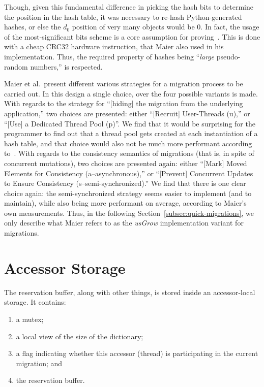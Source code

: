 Though, given this fundamental difference in picking the hash bits to determine the position in the hash table, it was necessary to re-hash Python-generated hashes, or else the $d_0$ position of very many objects would be $0$.
In fact, the usage of the most-significant bits scheme is a core assumption for proving~\cite[Lemma~5.1]{maier}.
This is done with a cheap CRC32 hardware instruction, that Maier also used in his implementation.
Thus, the required property of hashes being ``\emph{large} pseudo-random numbers,'' is respected.

Maier et al.\ present different various strategies for a migration process to be carried out.
In this design a single choice, over the four possible variants is made.
With regards to the strategy for ``[hiding] the migration from the underlying application,'' two choices are presented: either ``[Recruit] User-Threads (u),'' or ``[Use] a Dedicated Thread Pool (p)''.
We find that it would be surprising for the programmer to find out that a thread pool gets created at each instantiation of a hash table, and that choice would also not be much more performant according to~\cite[\S8.4, Using Dedicated Growing Threads]{maier}.
With regards to the consistency semantics of migrations (that is, in spite of concurrent mutations), two choices are presented again: either ``[Mark] Moved Elements for Consistency (a--asynchronous),'' or ``[Prevent] Concurrent Updates to Ensure Consistency (s--semi-synchronized).''
We find that there is one clear choice again: the semi-synchronized strategy seems easier to implement (and to maintain), while also being more performant on average, according to Maier's own measurements.
Thus, in the following Section~\ref{subsec:quick-migrations}, we only describe what Maier refers to as the \emph{usGrow} implementation variant for migrations.


\section{Accessor Storage}\label{sec:accessor-storage}

The reservation buffer, along with other things, is stored inside an accessor-local storage.
It contains:
\begin{enumerate}
    \item a mutex;
    \item a local view of the size of the dictionary;
    \item a flag indicating whether this accessor (thread) is participating in the current migration; and
    \item the reservation buffer.
\end{enumerate}

